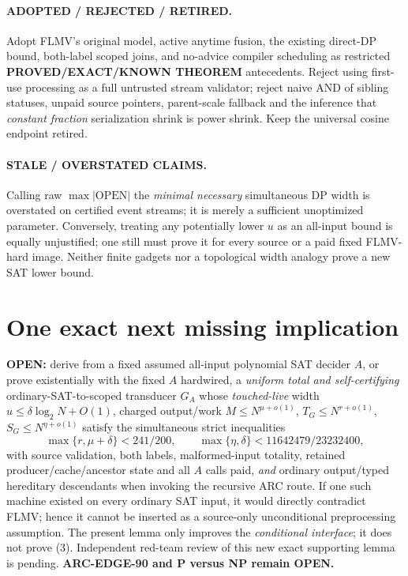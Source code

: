 \documentclass[11pt]{article}
\begin{document}
\paragraph{ADOPTED / REJECTED / RETIRED.}
Adopt FLMV's original model, active anytime fusion,
the existing direct-DP bound, both-label scoped joins,
and no-advice compiler scheduling as restricted
\textbf{PROVED/EXACT/KNOWN THEOREM} antecedents.
Reject using first-use processing as a full untrusted
stream validator; reject naive AND of sibling statuses,
unpaid source pointers, parent-scale fallback and
the inference that \emph{constant fraction} serialization
shrink is power shrink.
Keep the universal cosine endpoint retired.

\paragraph{STALE / OVERSTATED CLAIMS.}
Calling raw $\max|\mathrm{OPEN}|$ the \emph{minimal
necessary} simultaneous DP width is overstated on
certified event streams; it is merely a sufficient
unoptimized parameter. Conversely, treating any
potentially lower $u$ as an all-input bound is equally
unjustified; one still must prove it for every source or
a paid fixed FLMV-hard image. Neither finite gadgets
nor a topological width analogy prove a new SAT lower bound.

\section{One exact next missing implication}
\textbf{OPEN:} derive from a fixed assumed all-input
polynomial SAT decider $A$, or prove existentially with
the fixed $A$ hardwired, a \emph{uniform total and
self-certifying} ordinary-SAT-to-scoped transducer
$G_A$ whose \emph{touched-live} width
$u\le\delta\log_2N+O(1)$,
charged output/work $M\le N^{\mu+o(1)}$,
$T_G\le N^{r+o(1)}$, $S_G\le N^{\eta+o(1)}$
satisfy the simultaneous strict inequalities
\[
\max\{r,\mu+\delta\}<241/200,\qquad
\max\{\eta,\delta\}<11642479/23232400,
\tag{3}
\]
with source validation, both labels, malformed-input
totality, retained producer/cache/ancestor state and
all $A$ calls paid, \emph{and} ordinary output/typed
hereditary descendants when invoking the recursive ARC
route. If one such machine existed on every ordinary
SAT input, it would directly contradict FLMV; hence it
cannot be inserted as a source-only unconditional
preprocessing assumption. The present lemma only improves
the \emph{conditional interface}; it does not prove (3).
Independent red-team review of this new exact supporting
lemma is pending. \textbf{ARC-EDGE-90 and P versus NP remain OPEN.}
\end{document}
